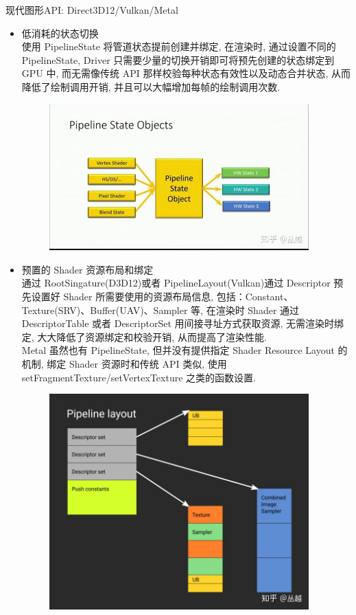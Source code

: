 \documentclass[UTF8]{ctexart}
\begin{document}
现代图形API: Direct3D12/Vulkan/Metal
\begin{itemize}
\item 低消耗的状态切换
  \\使用 PipelineState 将管道状态提前创建并绑定, 在渲染时, 通过设置不同的 PipelineState, Driver 只需要少量的切换开销即可将预先创建的状态绑定到 GPU 中, 而无需像传统 API 那样校验每种状态有效性以及动态合并状态, 从而降低了绘制调用开销, 并且可以大幅增加每帧的绘制调用次数.
  \begin{figure}[h]
    \includegraphics[width=10cm]{pipline_state_object.jpg}
    \centering
  \end{figure}
\item 预置的 Shader 资源布局和绑定
  \\通过 RootSingature(D3D12)或者 PipelineLayout(Vulkan)通过 Descriptor 预先设置好 Shader 所需要使用的资源布局信息, 包括：Constant、Texture(SRV)、Buffer(UAV)、Sampler 等, 在渲染时 Shader 通过 DescriptorTable 或者 DescriptorSet 用间接寻址方式获取资源, 无需渲染时绑定, 大大降低了资源绑定和校验开销, 从而提高了渲染性能.
  \\Metal 虽然也有 PipelineState, 但并没有提供指定 Shader Resource Layout 的机制, 绑定 Shader 资源时和传统 API 类似, 使用 setFragmentTexture/setVertexTexture 之类的函数设置.
  \begin{figure}[h]
    \includegraphics[width=10cm]{data_resource_binding.jpg}

\end{figure}
\end{itemize}
\end{document}
